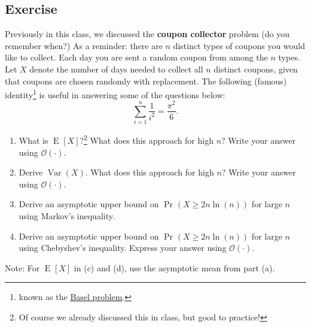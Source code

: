 \documentclass[14pt]{extreport}
\newcounter{counter}
\newcommand{\Exercise}{Exercise \stepcounter{counter}\thecounter}
\newcommand{\Var}[1]{\operatorname{Var}\left(#1\right)}
\newcommand{\E}[2][]{\operatorname{E}_{#1}\left[#2\right]}
\renewcommand{\Pr}[2][]{\operatorname{Pr}_{#1}\left(#2\right)}
\begin{document}
\subsection*{\Exercise}
    Previously in this class, we discussed the \textbf{coupon collector} problem (do you remember when?) As a reminder: there are \( n \) distinct types of coupons you would like to collect. Each day you are sent a random coupon from among the \( n \) types. Let \( X \) denote the number of days needed to collect all \( n \) distinct coupons, given that coupons are chosen randomly with replacement. The following (famous) identity\footnote{known as the \href{https://en.wikipedia.org/wiki/Basel_problem}{Basel problem}.} is useful in answering some of the questions below:
    \[ \sum_{i=1}^{n} \frac{1}{i^2} = \frac{\pi^2}{6}. \]
    \begin{enumerate}
        \item What is \( \E{X}? \)\footnote{Of course we already discussed this in class, but good to practice!} What does this approach for high \( n \)? Write your answer using \( \mathcal{O}(\cdot) \).
        \item Derive \( \Var{X} \). What does this approach for high \( n \)? Write your answer using \( \mathcal{O}(\cdot) \).
        \item Derive an asymptotic upper bound on \( \Pr{X \geq 2n \ln(n)} \) for large \( n \) using Markov’s inequality.
        \item Derive an asymptotic upper bound on \( \Pr{X \geq 2n \ln(n)} \) for large \( n \) using Chebyshev’s inequality. Express your answer using \( \mathcal{O}(\cdot) \).
    \end{enumerate}
    Note: For \( \E{X} \) in (c) and (d), use the asymptotic mean from part (a).
\end{document}
